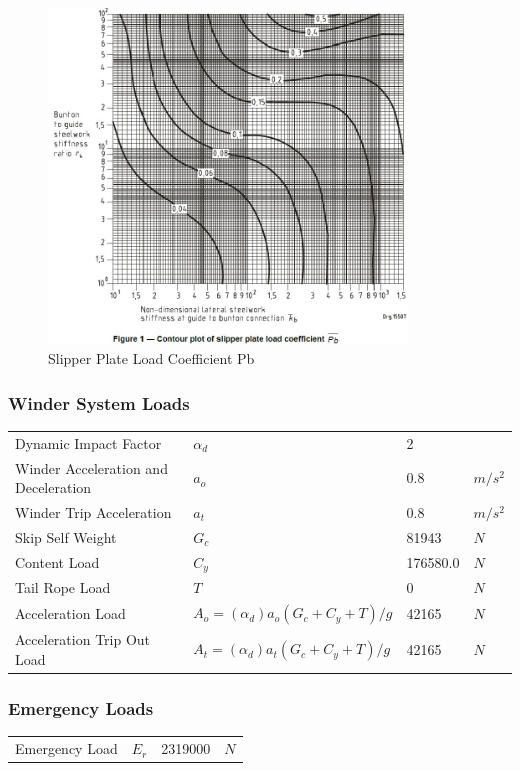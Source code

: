 \documentclass{article}%
\begin{document}
\begin{figure}[h!]%
\includegraphics[width=360px]{plate_load_coef.jpg}%
\centering%
\caption{Slipper Plate Load Coefficient Pb}%
\centering%
\end{figure}

%
\subsubsection{Winder System Loads}%
\label{ssubsec:WinderSystemLoads}%
\begin{flushleft}%
\begin{minipage}{\textwidth}%
\flushleft%
\begin{tabular}{l l l l}%
Dynamic Impact Factor&$\alpha_d$&2&\\%
Winder Acceleration and Deceleration&$a_o$&0.8&$m/s^2$\\%
Winder Trip Acceleration&$a_t$&0.8&$m/s^2$\\%
Skip Self Weight&$G_c$&81943&$N$\\%
Content Load&$C_y$&176580.0&$N$\\%
Tail Rope Load&$T$&0&$N$\\%
Acceleration Load&$A_o = (\alpha_d) a_o (G_c + C_y + T)/g$&42165&$N$\\%
Acceleration Trip Out Load&$A_t = (\alpha_d) a_t (G_c + C_y + T)/g$&42165&$N$\\%
\end{tabular}%
\end{minipage}%
\end{flushleft}

%
\subsubsection{Emergency Loads}%
\label{ssubsec:EmergencyLoads}%
\begin{flushleft}%
\begin{minipage}{\textwidth}%
\flushleft%
\begin{tabular}{l l l l}%
Emergency Load&$E_r$&2319000&$N$\\%
\end{tabular}%
\end{minipage}%
\end{flushleft}
\end{document}
